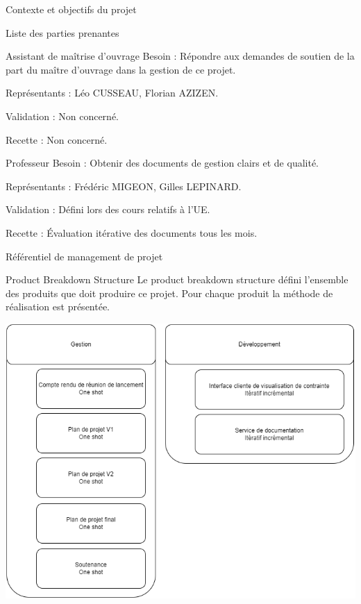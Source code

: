 \documentclass[]{article}
\begin{document}
{\begin{section}{\label{sec:Contexte et objectifs du projet}Contexte et objectifs du projet}
\begin{subsection}{\label{sec:Liste des parties prenantes}Liste des parties prenantes}
         \begin{subsubsection}{\label{sec:Assistant de maîtrise d’ouvrage}Assistant de maîtrise d’ouvrage}
             Besoin : Répondre aux demandes de soutien de la part du maître d'ouvrage dans la gestion de ce projet.

             Représentants : Léo CUSSEAU, Florian AZIZEN.

             Validation : Non concerné.

             Recette : Non concerné.
         \end{subsubsection}

         \begin{subsubsection}{\label{sec:Professeur}Professeur}
             Besoin : Obtenir des documents de gestion clairs et de qualité.

             Représentants : Frédéric MIGEON, Gilles LEPINARD.

             Validation : Défini lors des cours relatifs à l’UE.

             Recette : Évaluation itérative des documents tous les mois.
         \end{subsubsection}
     \end{subsection}
    \end{section}

    \newpage

    \begin{section}{\label{sec:Référentiel de management de projet}Référentiel de management de projet}
     \begin{subsection}{\label{sec:Product Breakdown Structure}Product Breakdown Structure}
         Le product breakdown structure défini l’ensemble des produits que doit produire ce projet. Pour chaque produit la méthode de réalisation est présentée.

         \includegraphics[scale=0.4]{documents/IMG/PBS}
     \end{subsection} 


\end{section}}
\end{document}
